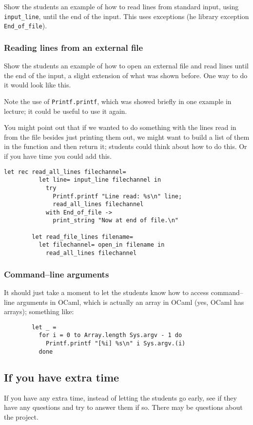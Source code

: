\documentclass[12pt]{article}
\begin{document}
        Show the students an example of how to read lines from standard input,
      using \texttt{input\_line}, until the end of the input.  This uses
      exceptions (he library exception \texttt{End\_of\_file}).

      \subsubsection{Reading lines from an external file}

        Show the students an example of how to open an external file and read
      lines until the end of the input, a slight extension of what was shown
      before.  One way to do it would look like this.

        Note the use of \texttt{Printf.printf}, which was showed briefly in
      one example in lecture; it could be useful to use it again.

        You might point out that if we wanted to do something with the lines
      read in from the file besides just printing them out, we might want to
      build a list of them in the function and then return it; students
      could think about how to do this.  Or if you have time you could add
      this.

        \begin{Verbatim}[xleftmargin=-5mm]
        let rec read_all_lines filechannel=
          let line= input_line filechannel in
            try
              Printf.printf "Line read: %s\n" line;
              read_all_lines filechannel
            with End_of_file ->
              print_string "Now at end of file.\n"

        let read_file_lines filename=
          let filechannel= open_in filename in
            read_all_lines filechannel
        \end{Verbatim}

      \subsubsection{Command--line arguments}

        It should just take a moment to let the students know how to access
      command--line arguments in OCaml, which is actually an array in OCaml
      (yes, OCaml has arrays); something like:

        \begin{Verbatim}
        let _ =
          for i = 0 to Array.length Sys.argv - 1 do
            Printf.printf "[%i] %s\n" i Sys.argv.(i)
          done
        \end{Verbatim}

    \subsection{If you have extra time}

      If you have any extra time, instead of letting the students go early,
    see if they have any questions and try to answer them if so.  There may
    be questions about the project.
\end{document}
